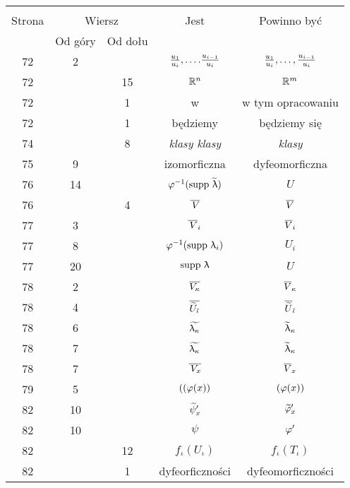 \documentclass[a4paper,11pt]{article}
\begin{document}
\begin{center}
  \begin{tabular}{|c|c|c|c|c|}
    \hline
    & \multicolumn{2}{c|}{} & & \\
    Strona & \multicolumn{2}{c|}{Wiersz} & Jest
                              & Powinno być \\ \cline{2-3}
    & Od góry & Od dołu &  &  \\
    \hline
    72  &  2 & & $\frac{ u_{ 1 } }{ u_{ i } },
                 \ldots. \frac{ u_{ i - 1 } }{ u_{ i } }$
           & $\frac{ u_{ 1 } }{ u_{ i } }, \ldots,
             \frac{ u_{ i - 1 } }{ u_{ i } }$ \\
    72  & & 15 & $\mathbb{R}^{ n }$ & $\mathbb{R}^{ m }$ \\
    72  & &  1 & w & w tym opracowaniu \\
    72  & &  1 & będziemy & będziemy się \\
    74  & &  8 & \emph{klasy klasy} & \emph{klasy} \\
    75  &  9 & & izomorficzna & dyfeomorficzna \\
    76  & 14 & & $\varphi^{ -1 }( \mathrm{supp}\, \, \widetilde{ \uplambda } )$ & $U$ \\
    76  & &  4 & $\overline{ \, V }$ & $\overline{ V }$ \\
    77  &  3 & & $\overline{\, V}_{ i }$ & $\overline{ V }_{ i }$ \\
    77  &  8 & & $\varphi^{ -1 }( \mathrm{supp}\, \, \uplambda_{ i } )$ & $U_{ i }$ \\
    77  & 20 & & $\mathrm{supp}\, \, \uplambda$ & $U$ \\
    78  &  2 & & $\overline{ V_{ \kappa } }$ & $\overline{ V }_{ \kappa }$ \\
    78  &  4 & & $\overline{ \widetilde{ U }_{ \tilde{ \iota } } }$
           & $\overline{ \widetilde{ U } }_{ \tilde{ \iota } }$ \\
    78  &  6 & & $\widetilde{ \uplambda_{ \kappa } }$
           & $\widetilde{ \uplambda }_{ \kappa }$ \\
    78  &  7 & & $\widetilde{ \uplambda_{ \kappa } }$
           & $\widetilde{ \uplambda }_{ \kappa }$ \\
    78  &  7 & & $\overline{ \, V_{ x } }$ & $\overline{ V }_{ x }$ \\
    79  &  5 & & $( ( \varphi( x ) )$ & $( \varphi( x ) )$ \\
    82  & 10 & & $\widetilde{ \psi }'_{ x }$
           & $\widetilde{ \varphi }'_{ x }$ \\
    82  & 10 & & $\psi$ & $\varphi'$ \\
    82  & & 12 & $f_{ \iota }( U_{ \iota } )$ & $f_{ \iota }( T_{ \iota } )$ \\
    82  & &  1 & dyfeorficzności & dyfeomorficzności \\

\end{tabular}
\end{center}
\end{document}
